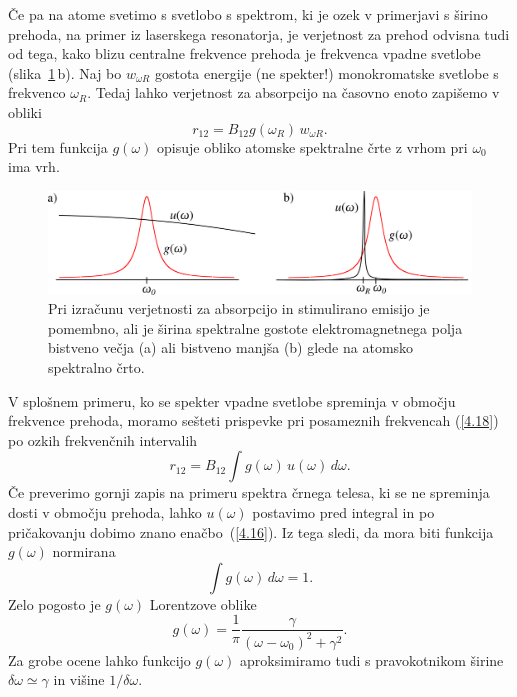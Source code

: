 \noindent
Če pa na atome svetimo s svetlobo s spektrom, ki je ozek v primerjavi s širino prehoda, na
primer iz laserskega resonatorja, je verjetnost za prehod odvisna tudi od tega, kako
blizu centralne frekvence prehoda je frekvenca vpadne svetlobe (slika~\ref{fig:spektri}\,b). 
Naj bo $w_{\omega R}$ gostota energije (ne spekter!) monokromatske svetlobe s frekvenco
$\omega_R$. Tedaj lahko verjetnost za absorpcijo na časovno enoto zapišemo
v obliki 
\begin{equation}
r_{12}=B_{12}g(\omega_R)\, w_{\omega R}.
\label{4.18}
\end{equation}
Pri tem funkcija $g(\omega)$ opisuje obliko atomske spektralne črte z vrhom 
pri $\omega_{0}$ ima vrh. \\
\begin{figure}[h]
\centering
\includegraphics[width=12truecm]{slike/05_Spektri.png}
\caption{Pri izračunu verjetnosti za absorpcijo in stimulirano emisijo je pomembno, ali je 
širina spektralne gostote elektromagnetnega polja bistveno večja (a) ali bistveno manjša (b)
glede na atomsko spektralno črto.}
\label{fig:spektri}
\end{figure}

\noindent
V splošnem primeru, ko se spekter vpadne svetlobe spreminja v območju 
frekvence prehoda, moramo sešteti prispevke pri posameznih frekvencah (\ref{4.18}) 
po ozkih frekvenčnih intervalih
\begin{equation}
r_{12}=B_{12}\int g(\omega)\, u(\omega)\, d\omega.
\label{4.19}
\end{equation}
Če preverimo gornji zapis na primeru spektra črnega telesa, ki se ne spreminja 
dosti v območju prehoda, lahko $u(\omega)$ postavimo pred integral in po pričakovanju
dobimo znano enačbo~(\ref{4.16}). Iz tega sledi, da mora biti funkcija $g(\omega)$ normirana
\begin{equation}
\int g(\omega)\, d\omega=1.
\label{4.20}
\end{equation}
Zelo pogosto je $g(\omega)$ Lorentzove oblike
\begin{equation}
g(\omega)=\frac{1}{\pi}\frac{\gamma}{(\omega-\omega_{0})^{2}+\gamma^{2}}.
\label{4.21}
\end{equation}
Za grobe ocene lahko funkcijo $g(\omega)$ aproksimiramo tudi s pravokotnikom širine
$\delta\omega\simeq\gamma$ in višine $1/\delta\omega$.

